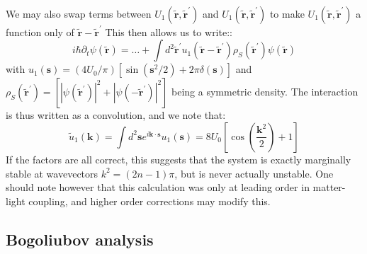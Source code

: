 \documentclass[twocolumn]{revtex4-1}
\renewcommand{\vec}[1]{\mathbf{#1}}
\newcommand{\tvr}{\tilde{\vec{r}}}
\newcommand{\tvrp}{\tilde{\vec{r}}^\prime}
\begin{document}
We may also swap terms between $U_1(\tvr, \tvrp)$ and $U_1(\tvr,
\tvrp)$ to make $U_1(\tvr,\tvrp)$ a function only of $\tvr-\tvrp$
This then allows us to write::
\begin{displaymath}
  i \hbar \partial_t \psi(\tvr) =
  \ldots +
  \int d^2 \tvrp
  u_1(\tvr- \tvrp) 
  \rho_S(\tvrp) \psi(\tvr)
\end{displaymath}
with $u_1(\vec{s}) = (4 U_0/\pi) \left[ \sin(\vec{s}^2/2) + 2\pi
  \delta(\vec{s})\right]$ and $\rho_S(\tvrp) = \left[ |\psi(\tvrp)|^2 +
  |\psi(-\tvrp)|^2 \right]$ being a symmetric density. The interaction
is thus written as a convolution, and we note that:
\begin{displaymath}
  \tilde{u}_1(\vec{k}) = 
  \int {d^2\vec{s}} e^{i \vec{k}\cdot\vec{s}}
  u_1(\vec{s}) 
  =
  8 U_0
  \left[
    \cos\left(\frac{\vec{k}^2}{2} \right)
    + 1
  \right]
\end{displaymath}
 If the factors are all
correct, this suggests that the system is exactly marginally stable at
wavevectors $k^2 = (2n-1) \pi$, but is never actually unstable.  One
should note however that this calculation was only at leading order in
matter-light coupling, and higher order corrections may modify this.



\subsection{Bogoliubov analysis}
\label{sec:bogoliubov-analysis}
\end{document}
